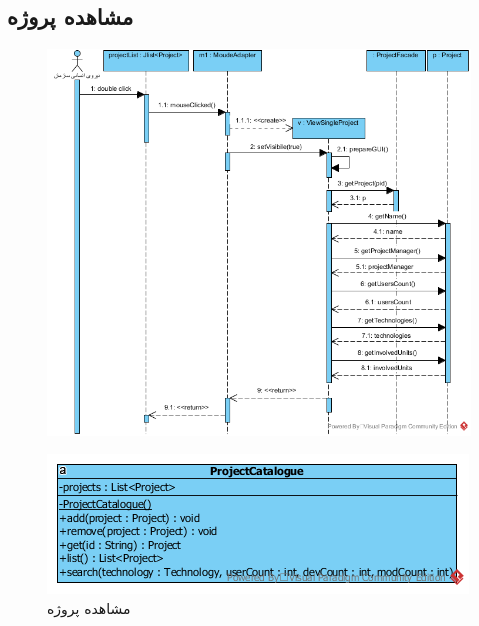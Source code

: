 \begin{landscape}
\section{مشاهده پروژه}
\begin{figure}[H]
	\centering
	\includegraphics[scale=0.7]{img/sequence-design/ViewProject}
\end{figure}
\begin{figure}[H]
	\centering
	\includegraphics[scale=0.8]{img/sequence-design/ViewProjectC}
	\caption{مشاهده پروژه}
\end{figure}


\end{landscape}
